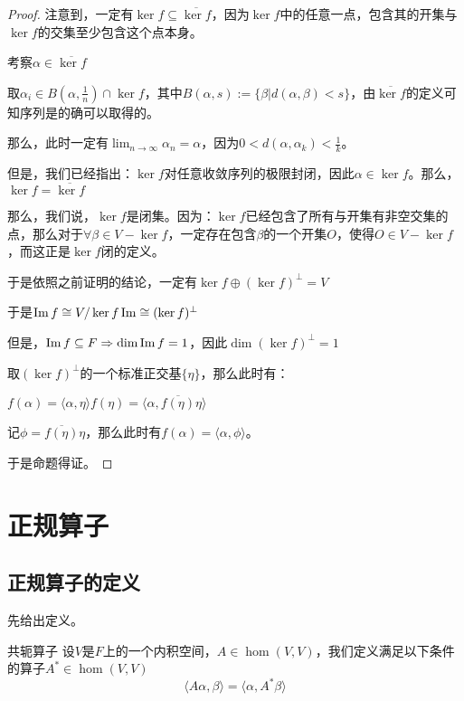 \documentclass[12pt, a4paper, oneside, UTF8]{ctexbook}
\begin{document}
\begin{para}{0}
\begin{proof}
							注意到，一定有$\ker f \subseteq \overline{\ker f}$，因为$\ker f$中的任意一点，包含其的开集与$\ker f$的交集至少包含这个点本身。

							考察$\alpha \in \overline{\ker f}$

							取$\alpha_i \in B(\alpha ,\frac{1}{n}) \cap \ker f$，其中$B(\alpha ,s):=\{\beta |d(\alpha ,\beta )< s\}$，由$\overline{\ker f}$的定义可知序列是的确可以取得的。

							那么，此时一定有$\lim_{n \to \infty} \alpha_n = \alpha $，因为$0 < d(\alpha ,\alpha_k)<\frac{1}{k}$。

							但是，我们已经指出：$\ker f$对任意收敛序列的极限封闭，因此$\alpha \in \ker f$。那么，$\ker f = \overline{\ker f}$

							那么，我们说，$\ker f$是闭集。因为：$\ker f$已经包含了所有与开集有非空交集的点，那么对于$\forall \beta \in V-\ker f$，一定存在包含$\beta $的一个开集$O$，使得$O\in V-\ker f$，而这正是$\ker f$闭的定义。

							于是依照之前证明的结论，一定有$\ker f \oplus (\ker f)^{\perp} = V$

							于是$\operatorname{Im} f \cong V/\ker f \operatorname{Im} \cong (\ker f)^{\perp}$

							但是，$\operatorname{Im} f \subseteq F \Rightarrow \dim \operatorname{Im} f = 1$，因此$\dim (\ker f)^{\perp} = 1$

							取$(\ker f)^{\perp}$的一个标准正交基$\{\eta \}$，那么此时有：

							$f(\alpha )=\langle \alpha ,\eta \rangle f(\eta) =\langle \alpha ,\overline{f(\eta )}\eta \rangle$

							记$\phi = \overline{f(\eta )}\eta$，那么此时有$f(\alpha )=\langle \alpha ,\phi \rangle$。

							于是命题得证。
						\end{proof}
			\end{para}
	\section{正规算子}
		\subsection{正规算子的定义}
			先给出定义。
			\begin{defn}{共轭算子}{}
				设$V$是$F$上的一个内积空间，$A \in \hom(V,V)$，我们定义满足以下条件的算子$A^* \in \hom(V,V)$
				\begin{equation}
					\langle A\alpha ,\beta \rangle =\langle \alpha ,A^*\beta \rangle
				\end{equation}
			\end{defn}
\end{document}
